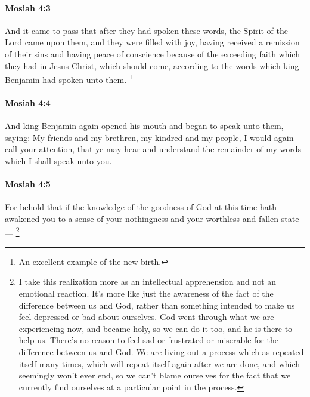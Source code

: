 		\paragraph{Mosiah 4:3} %
			\label{MOSIAH-4-3}

			And it came to pass that after they had spoken these words,
			the Spirit of the Lord came upon them,
			and they were filled with joy,
			having received a remission of their sins
			and having peace of conscience because of the exceeding faith
			which they had in Jesus Christ, which should come,
			according to the words which king Benjamin had spoken unto them.%
				\footnote{%
					\label{MOSIAH-4-3-NOTE-newbirth}%
					An excellent example of the \hyperref[NEWBIRTH]{new birth}.
					}

		\paragraph{Mosiah 4:4} %
			\label{MOSIAH-4-4}

			And king Benjamin again opened his mouth
			and began to speak unto them, saying:
			My friends and my brethren, my kindred and my people,
			I would again call your attention,
			that ye may hear and understand the remainder of my words
			which I shall speak unto you.

		\paragraph{Mosiah 4:5} %
			\label{MOSIAH-4-5}

			For behold that if the knowledge of the goodness of God
			at this time hath awakened you
			to a sense of your nothingness and your worthless and fallen state---%
				\footnote{%
					\label{MOSIAH-4-5-NOTE-nothingness}%
					I take this realization more as an intellectual apprehension and not an emotional reaction. It's more like just the awareness of the fact of the difference between us and God, rather than something intended to make us feel depressed or bad about ourselves. God went through what we are experiencing now, and became holy, so we can do it too, and he is there to help us. There's no reason to feel sad or frustrated or miserable for the difference between us and God. We are living out a process which as repeated itself many times, which will repeat itself again after we are done, and which seemingly won't ever end, so we can't blame ourselves for the fact that we currently find ourselves at a particular point in the process.
					}

